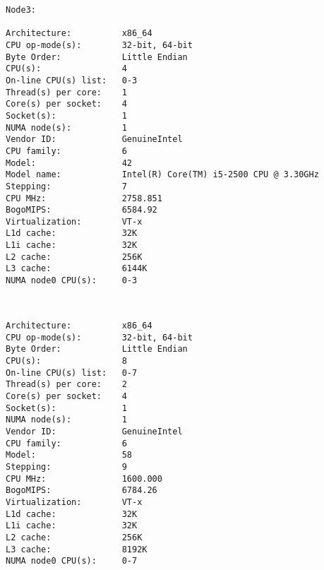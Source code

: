 \begin{verbatim}
Node3:

Architecture:          x86_64
CPU op-mode(s):        32-bit, 64-bit
Byte Order:            Little Endian
CPU(s):                4
On-line CPU(s) list:   0-3
Thread(s) per core:    1
Core(s) per socket:    4
Socket(s):             1
NUMA node(s):          1
Vendor ID:             GenuineIntel
CPU family:            6
Model:                 42
Model name:            Intel(R) Core(TM) i5-2500 CPU @ 3.30GHz
Stepping:              7
CPU MHz:               2758.851
BogoMIPS:              6584.92
Virtualization:        VT-x
L1d cache:             32K
L1i cache:             32K
L2 cache:              256K
L3 cache:              6144K
NUMA node0 CPU(s):     0-3


\end{verbatim}


\begin{verbatim}

Architecture:          x86_64
CPU op-mode(s):        32-bit, 64-bit
Byte Order:            Little Endian
CPU(s):                8
On-line CPU(s) list:   0-7
Thread(s) per core:    2
Core(s) per socket:    4
Socket(s):             1
NUMA node(s):          1
Vendor ID:             GenuineIntel
CPU family:            6
Model:                 58
Stepping:              9
CPU MHz:               1600.000
BogoMIPS:              6784.26
Virtualization:        VT-x
L1d cache:             32K
L1i cache:             32K
L2 cache:              256K
L3 cache:              8192K
NUMA node0 CPU(s):     0-7

\end{verbatim}